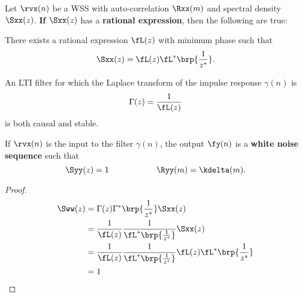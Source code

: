 \begin{theorem}
\label{thm:d-innovations}
Let $\rvx(n)$ be a WSS  with auto-correlation $\Rxx(m)$
and spectral density $\Sxx(z)$.
\textbf{If} $\Sxx(z)$ has a \textbf{rational expression},
then the following are true:

\begin{enume}
   \item There exists a rational expression $\fL(z)$ with minimum phase
         such that
         \[ \Sxx(z) =\fL(z)\fL^\ast\brp{\frac{1}{z^\ast}}. \]
   \item An LTI filter for which the Laplace transform of
         the impulse response $\gamma(n)$ is
         \[ \Gamma(z) = \frac{1}{\fL(z)} \]
         is both causal and stable.
   \item If $\rvx(n)$ is the input to the filter $\gamma(n)$,
         the output $\fy(n)$ is a \textbf{white noise sequence} such that
         \[ \Syy(z)=1 \hspace{2cm} \Ryy(m)=\kdelta(m).\]
\end{enume}
\end{theorem}


\begin{proof}
\begin{align*}
   \Sww(z)
     &= \Gamma(z)\Gamma^\ast\brp{\frac{1}{z^\ast}} \Sxx(z)
   \\&= \frac{1}{\fL(z)} \frac{1}{\fL^\ast\brp{\frac{1}{z^\ast}}} \Sxx(z)
   \\&= \frac{1}{\fL(z)} \frac{1}{\fL^\ast\brp{\frac{1}{z^\ast}}}
        \fL(z)\fL^\ast\brp{\frac{1}{z^\ast}}
   \\&= 1
\end{align*}
\end{proof}

